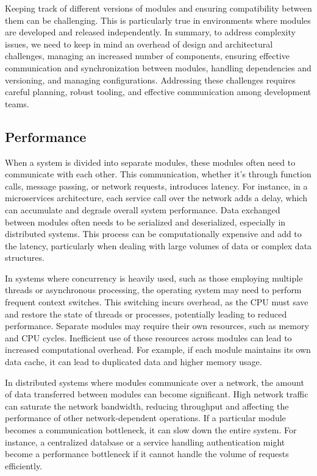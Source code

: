 Keeping track of different versions of modules and ensuring compatibility between them can be challenging. This is particularly true in environments where modules are developed and released independently.
In summary, to address complexity issues, we need to keep in mind an overhead of design and architectural challenges, managing an increased number of components, ensuring effective communication and synchronization between modules, handling dependencies and versioning, and managing configurations. Addressing these challenges requires careful planning, robust tooling, and effective communication among development teams.

\subsection{Performance}
When a system is divided into separate modules, these modules often need to communicate with each other. This communication, whether it’s through function calls, message passing, or network requests, introduces latency. For instance, in a microservices architecture, each service call over the network adds a delay, which can accumulate and degrade overall system performance.
Data exchanged between modules often needs to be serialized and deserialized, especially in distributed systems. This process can be computationally expensive and add to the latency, particularly when dealing with large volumes of data or complex data structures.
\par
In systems where concurrency is heavily used, such as those employing multiple threads or asynchronous processing, the operating system may need to perform frequent context switches. This switching incurs overhead, as the CPU must save and restore the state of threads or processes, potentially leading to reduced performance.
Separate modules may require their own resources, such as memory and CPU cycles. Inefficient use of these resources across modules can lead to increased computational overhead. For example, if each module maintains its own data cache, it can lead to duplicated data and higher memory usage.
\par
In distributed systems where modules communicate over a network, the amount of data transferred between modules can become significant. High network traffic can saturate the network bandwidth, reducing throughput and affecting the performance of other network-dependent operations.
If a particular module becomes a communication bottleneck, it can slow down the entire system. For instance, a centralized database or a service handling authentication might become a performance bottleneck if it cannot handle the volume of requests efficiently.
